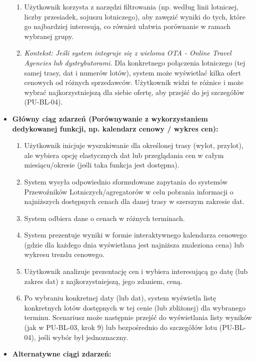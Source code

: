 \documentclass[a4paper,12pt]{article}
\begin{document}
\begin{itemize}
\begin{enumerate}
            \item Użytkownik korzysta z narzędzi filtrowania (np. według linii lotniczej, liczby przesiadek, sojuszu lotniczego), aby zawęzić wyniki do tych, które go najbardziej interesują, co również ułatwia porównanie w ramach wybranej grupy.
            \item \textit{Kontekst: Jeśli system integruje się z wieloma OTA - Online Travel Agencies lub dystrybutorami.} Dla konkretnego połączenia lotniczego (tej samej trasy, dat i numerów lotów), system może wyświetlać kilka ofert cenowych od różnych sprzedawców. Użytkownik widzi te różnice i może wybrać najkorzystniejszą dla siebie ofertę, aby przejść do jej szczegółów (PU-BL-04).
        \end{enumerate}
    \item \textbf{Główny ciąg zdarzeń (Porównywanie z wykorzystaniem dedykowanej funkcji, np. kalendarz cenowy / wykres cen):}
        \begin{enumerate}
            \item Użytkownik inicjuje wyszukiwanie dla określonej trasy (wylot, przylot), ale wybiera opcję elastycznych dat lub przeglądania cen w całym miesiącu/okresie (jeśli taka funkcja jest dostępna).
            \item System wysyła odpowiednio sformułowane zapytania do systemów Przewoźników Lotniczych/agregatorów w celu pobrania informacji o najniższych dostępnych cenach dla danej trasy w szerszym zakresie dat.
            \item System odbiera dane o cenach w różnych terminach.
            \item System prezentuje wyniki w formie interaktywnego kalendarza cenowego (gdzie dla każdego dnia wyświetlana jest najniższa znaleziona cena) lub wykresu trendu cenowego.
            \item Użytkownik analizuje prezentację cen i wybiera interesującą go datę (lub zakres dat) z najkorzystniejszą, jego zdaniem, ceną.
            \item Po wybraniu konkretnej daty (lub dat), system wyświetla listę konkretnych lotów dostępnych w tej cenie (lub zbliżonej) dla wybranego terminu. Scenariusz może następnie przejść do wyświetlania listy wyników (jak w PU-BL-03, krok 9) lub bezpośrednio do szczegółów lotu (PU-BL-04), jeśli wybór był jednoznaczny.
        \end{enumerate}
    \item \textbf{Alternatywne ciągi zdarzeń:}
        \begin{itemize}

\end{itemize}
\end{itemize}
\end{document}

